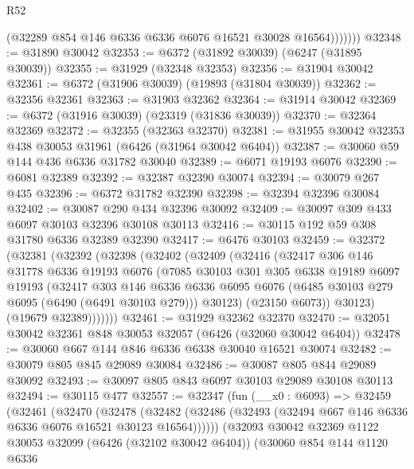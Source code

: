 \begin{lexlean}{R52}
\begin{coremodule}
                (@32289 @854 @146 @6336 @6336 @6076 @16521 @30028 @16564)))))))
@32348 := @31890 @30042
@32353 := @6372 (@31892 @30039) (@6247 (@31895 @30039))
@32355 := @31929 (@32348 @32353)
@32356 := @31904 @30042
@32361 := @6372 (@31906 @30039) (@19893 (@31804 @30039))
@32362 := @32356 @32361
@32363 := @31903 @32362
@32364 := @31914 @30042
@32369 := @6372 (@31916 @30039) (@23319 (@31836 @30039))
@32370 := @32364 @32369
@32372 := @32355 (@32363 @32370)
@32381 := @31955 @30042 @32353 @438 @30053 @31961 (@6426 (@31964 @30042 @6404))
@32387 := @30060 @59 @144 @436 @6336 @31782 @30040
@32389 := @6071 @19193 @6076
@32390 := @6081 @32389
@32392 := @32387 @32390 @30074
@32394 := @30079 @267 @435
@32396 := @6372 @31782 @32390
@32398 := @32394 @32396 @30084
@32402 := @30087 @290 @434 @32396 @30092
@32409 := @30097 @309 @433 @6097 @30103 @32396 @30108 @30113
@32416 := @30115 @192 @59 @308 @31780 @6336 @32389 @32390
@32417 := @6476 @30103
@32459 := @32372
    (@32381
      (@32392
        (@32398
          (@32402
            (@32409
              (@32416
                (@32417
                  @306
                  @146
                  @31778
                  @6336
                  @19193
                  @6076
                  (@7085
                    @30103
                    @301
                    @305
                    @6338
                    @19189
                    @6097
                    @19193
                    (@32417
                      @303
                      @146
                      @6336
                      @6336
                      @6095
                      @6076
                      (@6485 @30103 @279 @6095 (@6490 (@6491 @30103 @279)))
                      @30123)
                    (@23150 @6073))
                  @30123)
                (@19679 @32389)))))))
@32461 := @31929 @32362 @32370
@32470 := @32051 @30042 @32361 @848 @30053 @32057 (@6426 (@32060 @30042 @6404))
@32478 := @30060 @667 @144 @846 @6336 @6338 @30040 @16521 @30074
@32482 := @30079 @805 @845 @29089 @30084
@32486 := @30087 @805 @844 @29089 @30092
@32493 := @30097 @805 @843 @6097 @30103 @29089 @30108 @30113
@32494 := @30115 @477
@32557 := @32347
    (fun (__x0 : @6093) =>
    @32459
      (@32461
        (@32470
          (@32478
            (@32482 (@32486 (@32493 (@32494 @667 @146 @6336 @6336 @6076 @16521 @30123 @16564))))))
        (@32093
          @30042
          @32369
          @1122
          @30053
          @32099
          (@6426 (@32102 @30042 @6404))
          (@30060
            @854
            @144
            @1120
            @6336

\end{coremodule}
\end{lexlean}
